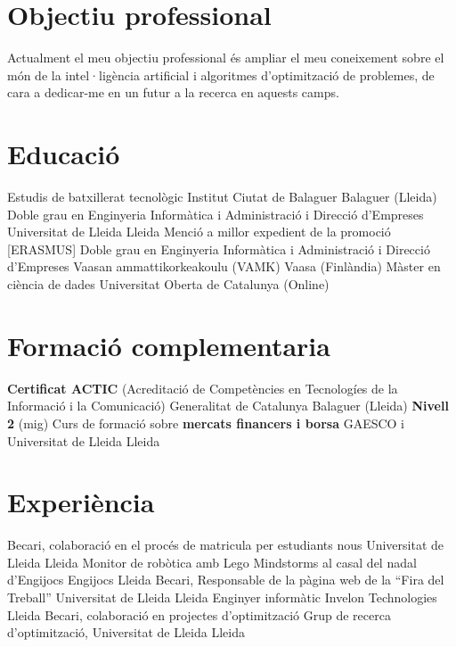 \documentclass[a4paper,12pt,final]{moderncv}
\begin{document}
\makecvtitle

\section{Objectiu professional}
Actualment el meu objectiu professional és ampliar el meu coneixement
sobre el món de la intel·ligència artificial i algoritmes d'optimització
de problemes, de cara a dedicar-me en un futur a la recerca en aquests camps.

\section{Educació}
	{Estudis de batxillerat tecnològic}
	{Institut Ciutat de Balaguer}
	{Balaguer (Lleida)}
	{}
	{}
	{Doble grau en Enginyeria Informàtica i Administració i Direcció
		d'Empreses}
	{Universitat de Lleida}
	{Lleida}
	{Menció a millor expedient de la promoció}
	{}
	{[ERASMUS] Doble grau en Enginyeria Informàtica i
		Administració i Direcció d'Empreses}
	{Vaasan ammattikorkeakoulu (VAMK)}
	{Vaasa (Finlàndia)}
	{}
	{}
	{Màster en ciència de dades}
	{Universitat Oberta de Catalunya}
	{(Online)}
	{}
	{}

\section{Formació complementaria}
	{\textbf{Certificat ACTIC} (Acreditació de Competències en Tecnologíes de
		la Informació i la Comunicació)}
	{Generalitat de Catalunya}
	{Balaguer (Lleida)}
	{\textbf{Nivell 2} (mig)}
	{}
	{Curs de formació sobre \textbf{mercats financers i borsa}}
	{GAESCO i Universitat de Lleida}
	{Lleida}
	{}
	{}
	{}

\section{Experiència}
	{Becari, colaboració en el procés de matricula per estudiants nous}
	{Universitat de Lleida}
	{Lleida}
	{}
	{}
	{Monitor de robòtica amb Lego Mindstorms al casal del nadal d'Engijocs}
	{Engijocs}
	{Lleida}
	{}
	{}
	{Becari, Responsable de la pàgina web de la ``Fira del Treball''}
	{Universitat de Lleida}
	{Lleida}
	{}
	{}
	{Enginyer informàtic}
	{Invelon Technologies}
	{Lleida}
	{}
	{}
	{Becari, colaboració en projectes d'optimització}
	{Grup de recerca d'optimització, Universitat de Lleida}
	{Lleida}
	{}
	{}
\end{document}
